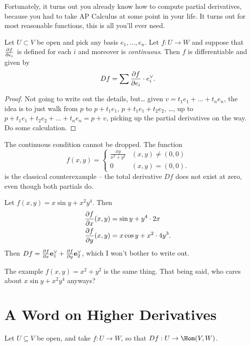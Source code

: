 \documentclass[11pt]{scrreprt}
\begin{document}
Fortunately, it turns out you already know how to compute partial derivatives,
because you had to take AP Calculus at some point in your life.
It turns out for most reasonable functions, this is all you'll ever need.
\begin{theorem}
	Let $U \subset V$ be open and pick any basis $e_1, \dots, e_n$.
	Let $f : U \to W$ and suppose that $\frac{\partial f}{\partial e_i}$ is defined
	for each $i$ and moreover is \emph{continuous}.
	Then $f$ is differentiable and given by
	\[ Df = \sum \frac{\partial f}{\partial e_i} \cdot e_i^\vee. \]
\end{theorem}
\begin{proof}
	Not going to write out the details, but\dots
	given $v = t_1e_1 + \dots + t_ne_n$,
	the idea is to just walk from $p$ to $p+t_1e_1$, $p+t_1e_1+t_2e_2$, \dots,
	up to $p+t_1e_1+t_2e_2+\dots+t_ne_n = p+v$,
	picking up the partial derivatives on the way.
	Do some calculation.
\end{proof}

\begin{remark}
	The continuous condition cannot be dropped. The function
	\[
			f(x,y)
		=
		\begin{cases}
			\frac{xy}{x^2+y^2} & (x,y) \neq (0,0) \\
			0 & (x,y) = (0,0).
		\end{cases}
	\]
	is the classical counterexample -- the total derivative $Df$ does not exist at zero,
	even though both partials do.
\end{remark}

\begin{example}
	Let $f(x,y) = x \sin y + x^2y^4$. Then
	\begin{align*}
		\frac{\partial f}{\partial x} (x,y) &= \sin y + y^4 \cdot 2x \\
		\frac{\partial f}{\partial y} (x,y) &= x \cos y + x^2 \cdot 4y^3.
	\end{align*}
	Then $Df = \frac{\partial f}{\partial x} \mathbf e_1^\vee + \frac{\partial f}{\partial y} \mathbf e_2^\vee$,
	which I won't bother to write out.
\end{example}

The example $f(x,y) = x^2+y^2$ is the same thing.
That being said, who cares about $x \sin y + x^2y^4$ anyways?

\section{A Word on Higher Derivatives}
Let $U \subseteq V$ be open, and take $f : U \to W$, so that $Df : U \to \Hom(V,W)$.
\end{document}
